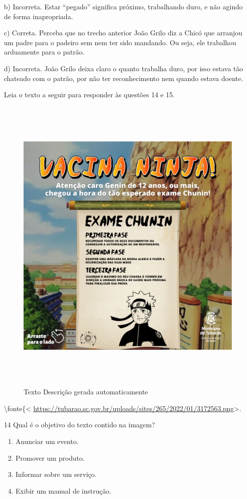 b) Incorreta. Estar ``pegado'' significa próximo, trabalhando duro, e
não agindo de forma inapropriada.

c) Correta. Perceba que no trecho anterior João Grilo diz a Chicó que
arranjou um padre para o padeiro sem nem ter sido mandando. Ou seja, ele
trabalhou arduamente para o patrão.

d) Incorreta. João Grilo deixa claro o quanto trabalha duro, por isso
estava tão chateado com o patrão, por não ter reconhecimento nem quando
estava doente.

Leia o texto a seguir para responder às questões 14 e 15.

\begin{figure}
\centering
\includegraphics[width=5.90556in,height=5.90556in]{./imgSAEB_6_POR/media/image51.png}
\caption{Texto Descrição gerada automaticamente}
\end{figure}

\textbackslash fonte\{\textless{}
\url{https://tubarao.sc.gov.br/uploads/sites/265/2022/01/3172563.png}\textgreater.

\num{14} Qual é o objetivo do texto contido na imagem?

\begin{enumerate}
\def\labelenumi{\alph{enumi})}
\item
  Anunciar um evento.
\item
  Promover um produto.
\item
  Informar sobre um serviço.
\item
  Exibir um manual de instrução.
\end{enumerate}

